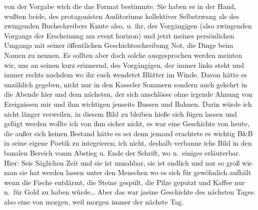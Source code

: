 \documentclass[
]{article}
\begin{document}
von der Vorgabe wich die das Format bestimmte. Sie haben es in der Hand,
wußten beide, des protagonisten Auditoriums kollektiver Selbstzwang als
des zwingenden Buchschreibers Knute also, u. ihr, des Vorgängigen (also
zwingenden Vorgangs der Erscheinung am event horizon) und jetzt meines
persönlichen Umgangs mit seiner öffentlichen Geschichtsschreibung Not,
die Dinge beim Namen zu nennen. Es sollten aber doch solche
ausgesprochen werden meinten wir, uns an seinen kurz erinnernd, des
Vorgängigen, der immer links steht und immer rechts nachdem wo ihr euch
wendetet Blätter im Winde. Davon hätte es unzählich gegeben, nicht nur
in den Kasseler Sommern sondern auch gekehrt in die Abende hier und dem
nächsten, der sich anschlösse ohne irgende Ahnung von Ereignissen mir
und ihm wichtigen jenseits Bussen und Bahnen. Darin würde ich nicht
länger verweilen, in diesem Bild zu bleiben hieße sich fügen lassen und
gefügt werden wollte ich von ihm sicher nicht, es war eine Geschichte
von heute, die außer sich keinen Bestand hätte es sei denn jemand
erachtete es wichtig B\&B in seine eigene Poetik zu integrieren; ich
nicht, deshalb verbanne ichs Bild in den banalen Bereich vonm Abstieg u.
Ende der Schrift, wo n.~einiges erläuterbar. Hier: Seis Säglichen Zeit
und sie ist unnahbar, sie ist endlich und nur so groß wie man sie hat
werden lassen unter den Menschen wo es sich für gewöhnlich aufhält wenn
die Fische entdärmt, die Steine gespült, die Pilze geputzt und Kaffee
nur n.~für Gold zu haben würde\ldots{} Aber das war jaeine Geschichte
des nächsten Tages also eine von morgen, weil morgen immer der nächste
Tag.
\end{document}
